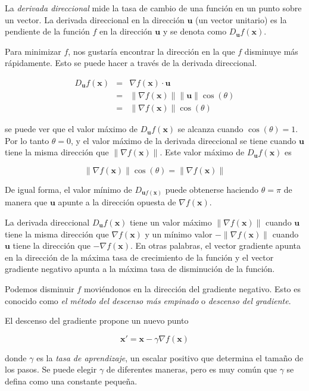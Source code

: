\begin{remark}
La \textit{derivada direccional} mide  la tasa de cambio de una función
en un punto sobre un vector. 
La derivada direccional en la dirección $\mathbf{u}$ (un vector
unitario) es la pendiente de la función $f$ en la dirección $\mathbf{u}$ y se denota como $D_\mathbf{u}f(\mathbf{x})$.
\end{remark}

Para minimizar $f$, nos gustaría encontrar la dirección en la que $f$ disminuye
más rápidamente. Esto se puede hacer a través de la derivada direccional.

\[
\begin{array}{rcl}
            D_\mathbf{u}f(\mathbf{x}) & = & \nabla f(\mathbf{x}) \cdot \mathbf{u}\\
           & = & \|\nabla f(\mathbf{x})\| \|\mathbf{u}\| \cos({\theta})\\
           & = & \|\nabla f(\mathbf{x})\| \cos({\theta})
   \end{array}
\]

se puede ver que el valor máximo de $D_\mathbf{u}f(\mathbf{x})$
se alcanza cuando $\cos({\theta}) = 1$. Por lo tanto $\theta = 0$, y
el valor máximo de la derivada direccional se tiene cuando $\mathbf{u}$
tiene la misma dirección que $\|\nabla f(\mathbf{x})\|$. Este valor
máximo de $D_\mathbf{u}f(\mathbf{x})$ es

\[
\|\nabla f(\mathbf{x})\| \cos({\theta}) = \|\nabla f(\mathbf{x})\| 
\]

De igual forma, el valor mínimo de $D_{\mathbf{u}f(\mathbf{x})}$ puede obtenerse haciendo $\theta  = \pi$ de manera que 
$\mathbf{u}$ apunte a la dirección opuesta de $\nabla f(\mathbf{x})$.\\


\begin{remark}
La derivada direccional $D_\mathbf{u}f(\mathbf{x})$ tiene un valor
máximo $\|\nabla f (\mathbf{\mathbf{x}})\|$
cuando $\mathbf{u}$ tiene la misma dirección que $ \nabla f (\mathbf{x})$ y un mínimo valor $-\|\nabla f (\mathbf{\mathbf{x}})\|$ cuando $\mathbf{u}$ tiene la dirección que $-\nabla f (\mathbf{\mathbf{x}})$. En otras palabras, el vector
gradiente apunta en la dirección de la máxima tasa de crecimiento de la función
y el vector gradiente negativo apunta a la máxima tasa de disminución de la 
función.
\end{remark}

\begin{remark}
Podemos disminuir $f$
moviéndonos en la dirección del gradiente negativo. Esto es conocido
como \textit{el método del descenso más empinado} o \textit{descenso del gradiente}.

El descenso del gradiente propone un nuevo punto

\[
\mathbf{x}' = \mathbf{x} - \gamma \nabla f(\mathbf{x})
\]


donde $\gamma$ es la \textit{tasa de aprendizaje}, un escalar positivo
que determina el tamaño de los pasos. Se puede elegir $\gamma$
de diferentes maneras, pero es muy común que $\gamma$
se defina como una constante pequeña.
\end{remark}

